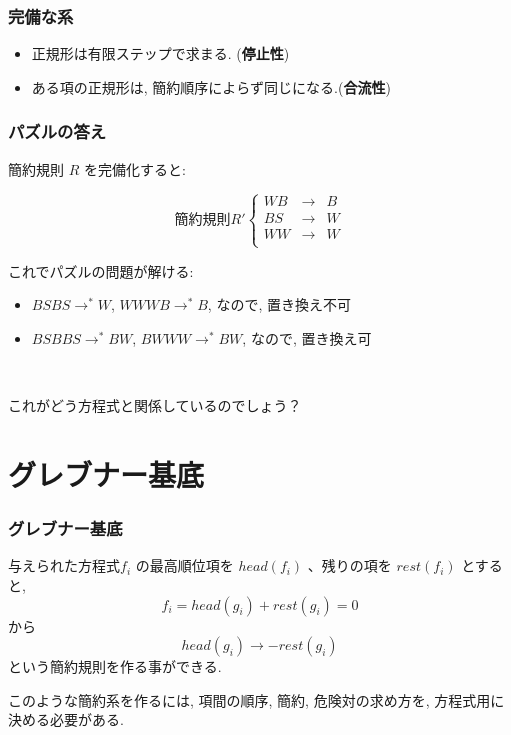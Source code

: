 \documentclass[dvipdfmx,11pt,notheorems]{beamer}
\theoremstyle{definition}
\begin{document}
\begin{frame}\frametitle{完備な系}
\begin{itemize}
\item 正規形は有限ステップで求まる. 
({\bf 停止性})
\item ある項の正規形は, 簡約順序によらず同じになる.({\bf 合流性})
\end{itemize}
\end{frame}

\begin{frame}\frametitle{パズルの答え}

簡約規則 $R$ を完備化すると:

\[
\mbox{簡約規則} R' \left\{ \begin{array}{rll}
WB & \rightarrow  &  B\\
BS & \rightarrow   & W  \\
WW & \rightarrow   & W  \\
	  \end{array}
\right.
\]

\begin{block}{これでパズルの問題が解ける:}
\begin{itemize}
\item $BSBS \rightarrow^* W$, 
$WWWB \rightarrow^* B$, なので, 置き換え不可

\item $BSBBS \rightarrow^* BW$, 
$BWWW \rightarrow^* BW$, なので, 置き換え可
\end{itemize} 
\end{block}
\ \\
\begin{alertblock}{これがどう方程式と関係しているのでしょう？}
\end{alertblock}
\end{frame}

\section{グレブナー基底}
\begin{frame}\frametitle{グレブナー基底}

与えられた方程式$f_i$ の最高順位項を $head(f_i)$ 、残りの項を 
$rest(f_i)$ とすると, 
\[ f_i = head(g_i) + rest(g_i)  = 0 \]
から
\[ head(g_i) \rightarrow - rest(g_i) \]
という簡約規則を作る事ができる.

このような簡約系を作るには, 項間の順序, 簡約, 危険対の求め方を,
方程式用に決める必要がある.
\end{frame}
\end{document}
